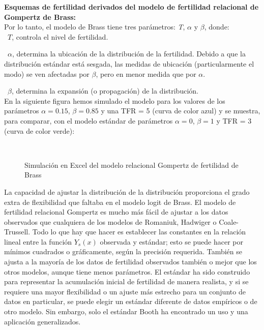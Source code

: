 \textbf{Esquemas de fertilidad derivados del modelo de fertilidad relacional de Gompertz de Brass:}\\

\noindent Por lo tanto, el modelo de Brass tiene tres parámetros: \textit{T}, $\alpha$ y $\beta$, donde:\\

\textbullet\ $T$, controla el nivel de fertilidad.

\textbullet\ $\alpha$, determina la ubicación de la distribución de la fertilidad. Debido a que la distribución estándar está sesgada, las medidas de ubicación (particularmente el modo) se ven afectadas por $\beta$, pero en menor medida que por $\alpha$.

\textbullet\ $\beta$, determina la expansión (o propagación) de la distribución.\\

En la siguiente figura hemos simulado el modelo para los valores de los parámetros $\alpha=0.15$, $\beta=0.85$ y una TFR = 5 (curva de color azul) y se muestra, para comparar, con el modelo estándar de parámetros  $\alpha=0$, $\beta=1$ y TFR = 3 (curva de color verde):

\begin{figure}[!ht]
\centering
\hspace*{-0.1cm}
\caption{Simulación en Excel del modelo relacional Gompertz de fertilidad de Brass}\\
\end{figure}

La capacidad de ajustar la distribución de la distribución proporciona el grado extra de flexibilidad que faltaba en el modelo logit de Brass. El modelo de fertilidad relacional Gompertz es mucho más fácil de ajustar a los datos observados que cualquiera de los modelos de Romaniuk, Hadwiger o Coale-Trussell. Todo lo que hay que hacer es establecer las constantes en la relación lineal entre la función $Y_{s}(x)$ observada y estándar; esto se puede hacer por mínimos cuadrados o gráficamente, según la precisión requerida. También se ajusta a la mayoría de los datos de fertilidad observados también o mejor que los otros modelos, aunque tiene menos parámetros. El estándar ha sido construido para representar la acumulación inicial de fertilidad de manera realista, y si se requiere una mayor flexibilidad o un ajuste más estrecho para un conjunto de datos en particular, se puede elegir un estándar diferente de datos empíricos o de otro modelo. Sin embargo, solo el estándar Booth ha encontrado un uso y una aplicación generalizados.

